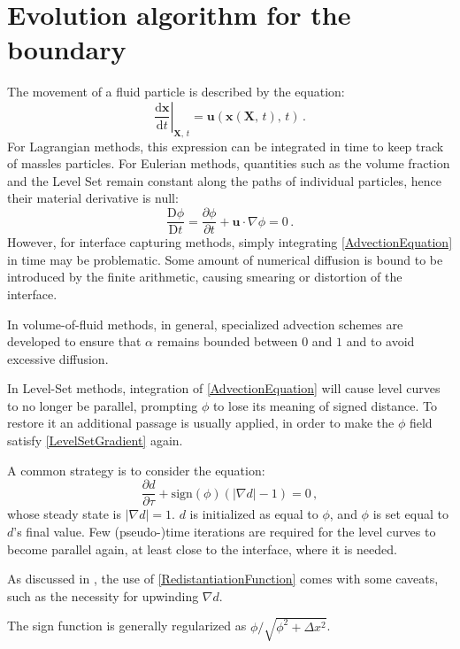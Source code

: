 \documentclass[11pt, a4paper, oneside, openany]{book}
\begin{document}
\section{Evolution algorithm for the boundary}
The movement of a fluid particle is described by the equation:
\begin{equation}
\left.\dfrac{\mathrm{d}\boldsymbol{x}}{\mathrm{d}t}\right|_{\boldsymbol{X},\,t}=\boldsymbol{u}\left(\boldsymbol{x}\left(\boldsymbol{X},\,t\right),\,t\right)\,.\label{AdvectionParticle}
\end{equation}
For Lagrangian methods, this expression can be integrated in time to keep track of massles particles. For Eulerian methods, quantities such as the volume fraction and the Level Set remain constant along the paths of individual particles, hence their material derivative is null:
\begin{equation}
\dfrac{\mathrm{D}\phi}{\mathrm{D}t}=\dfrac{\partial\phi}{\partial t}+\boldsymbol{u}\cdot\nabla\phi=0\,.\label{AdvectionEquation}
\end{equation}
However, for interface capturing methods, simply integrating \eqref{AdvectionEquation} in time may be problematic. Some amount of numerical diffusion is bound to be introduced by the finite arithmetic, causing smearing or distortion of the interface.\par
In volume-of-fluid methods, in general, specialized advection schemes are developed to ensure that $\alpha$ remains bounded between $0$ and $1$ and to avoid excessive diffusion.\par
In Level-Set methods, integration of \eqref{AdvectionEquation} will cause level curves to no longer be parallel, prompting $\phi$ to lose its meaning of signed distance. To restore it an additional passage is usually applied, in order to make the $\phi$ field satisfy \eqref{LevelSetGradient} again.\par
A common strategy is to consider the equation:
\begin{equation}
	\dfrac{\partial d}{\partial\tau}+\mathrm{sign}\left(\phi\right)\left(\left|\nabla d\right|-1\right)=0\,,\label{RedistantiationFunction}
\end{equation}
whose steady state is $\left|\nabla d\right|=1$. $d$ is initialized as equal to $\phi$, and $\phi$ is set equal to $d$'s final value. Few (pseudo-)time iterations are required for the level curves to become parallel again, at least close to the interface, where it is needed.\par
As discussed in \cite{hartmann2008differential}, the use of \eqref{RedistantiationFunction} comes with some caveats, such as the necessity for upwinding $\nabla d$.\par
The sign function is generally regularized as $\phi / \sqrt{\phi^{2}+\Delta x^{2}}$.
\end{document}
